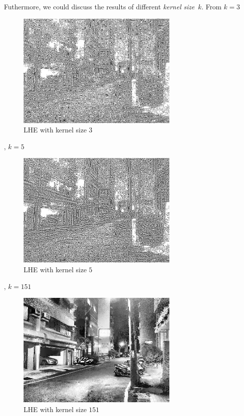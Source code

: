 Futhermore, we could discuss the results of different \textit{kernel size}~\(k\).
From $k=3$
\begin{figure}
  \centering
  \includegraphics[width=0.7\textwidth]{image/tmp/6_result_0.jpg}
  \caption{LHE with kernel size $3$}
  \label{fig2e_1}
\end{figure}
, $k=5$
\begin{figure}
  \centering
  \includegraphics[width=0.7\textwidth]{image/tmp/6_result_1.jpg}
  \caption{LHE with kernel size $5$}
  \label{fig2e_2}
\end{figure}
, $k=151$
\begin{figure}
  \centering
  \includegraphics[width=0.7\textwidth]{image/tmp/6_result_3.jpg}
  \caption{LHE with kernel size $151$}
  \label{fig2e_3}
\end{figure}
